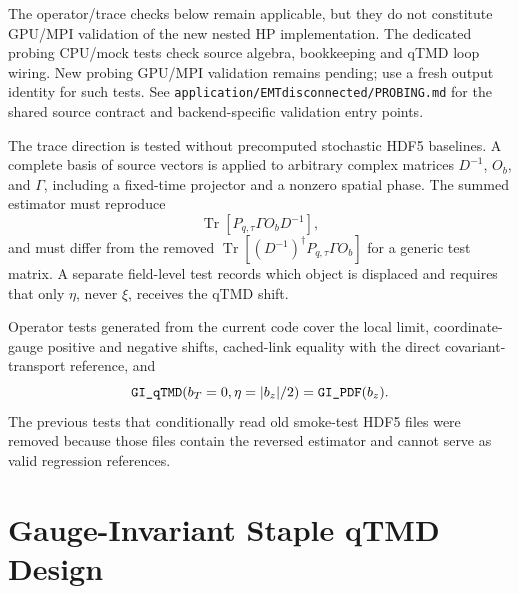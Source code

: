 \documentclass[11pt,a4paper]{article}
\newcommand{\code}[1]{\texttt{\begingroup\def\_{\textunderscore\allowbreak}#1\endgroup}}
\begin{document}
The operator/trace checks below remain applicable, but they do not constitute
GPU/MPI validation of the new nested HP implementation. The dedicated probing
CPU/mock tests check source algebra, bookkeeping and qTMD loop wiring. New
probing GPU/MPI validation remains pending; use a fresh output identity for
such tests. See \code{application/EMT\_disconnected\_1pt/PROBING.md} for the
shared source contract and backend-specific validation entry points.

The trace direction is tested without precomputed stochastic HDF5 baselines.
A complete basis of source vectors is applied to arbitrary complex matrices
\(D^{-1}\), \(O_b\), and \(\Gamma\), including a fixed-time projector and a
nonzero spatial phase.  The summed estimator must reproduce
\begin{equation}
  \operatorname{Tr}[P_{q,\tau}\Gamma O_bD^{-1}],
\end{equation}
and must differ from the removed
\(\operatorname{Tr}[(D^{-1})^\dagger P_{q,\tau}\Gamma O_b]\) for a generic
test matrix.  A separate field-level test records which object is displaced
and requires that only \(\eta\), never \(\xi\), receives the qTMD shift.

Operator tests generated from the current code cover the local limit,
coordinate-gauge positive and negative shifts, cached-link equality with the
direct covariant-transport reference, and
\begin{equation}
  \code{GI\_qTMD}(b_T=0,\eta=|b_z|/2)
  =
  \code{GI\_PDF}(b_z).
\end{equation}
The previous tests that conditionally read old smoke-test HDF5 files were
removed because those files contain the reversed estimator and cannot serve as
valid regression references.

\section{Gauge-Invariant Staple qTMD Design}
\end{document}
